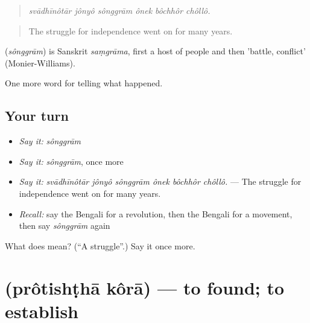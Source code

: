 \begin{quote}
     
\end{quote}

\begin{quote}
\emph{svādhīnôtār jônyô sônggrām ônek bôchhôr chôllô.}
\end{quote}

\begin{quote}
The struggle for independence went on for many years.
\end{quote}

\begin{cousinweb}
\textbf{} (\emph{sônggrām}) is Sanskrit \emph{saṃgrāma}, first a host of people and then 'battle, conflict' (Monier-Williams).
\end{cousinweb}

\begin{grammarlens}[title={What you've built}]
One more word for telling what happened.
\end{grammarlens}

\subsection*{Your turn}
\begin{itemize}
\raggedright
  \item \emph{Say it:} \emph{sônggrām}
  \item \emph{Say it:} \emph{sônggrām}, once more
  \item \emph{Say it:} \emph{svādhīnôtār jônyô sônggrām ônek bôchhôr chôllô.} — The struggle for independence went on for many years.
  \item \emph{Recall:} say the Bengali for a revolution, then the Bengali for a movement, then say \emph{sônggrām} again
\end{itemize}

\begin{tcolorbox}[breakable,colback=teal!4,colframe=teal!35!black,title={Before you move on}]
What does  mean? (\textquotedblleft{}A struggle\textquotedblright{}.) Say it once more.
\end{tcolorbox}
\section[\texorpdfstring{\bn{প্রতিষ্ঠা} \bn{করা} (prôtishṭhā kôrā)}{প্রতিষ্ঠা করা (prôtishṭhā kôrā)}]{  (prôtishṭhā kôrā) — to found; to establish}

